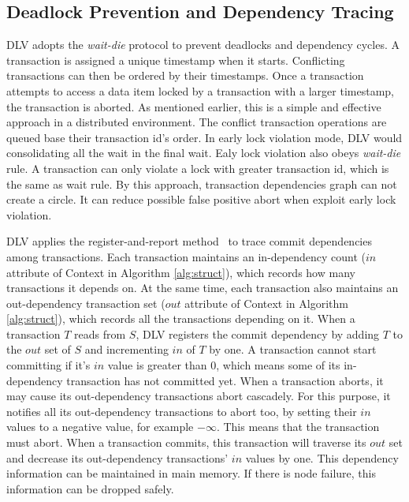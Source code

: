 \documentclass[conference]{IEEEtran}
\begin{document}
\subsection {Deadlock Prevention and Dependency Tracing}

DLV adopts the \emph{wait-die} protocol to prevent deadlocks and dependency cycles.
A transaction is assigned a unique timestamp when it starts.
Conflicting transactions can then be ordered by their timestamps.
Once a transaction attempts to access a data item locked by a transaction with a larger timestamp, the transaction is aborted.
As mentioned earlier, this is a simple and effective approach in a distributed environment.
The conflict transaction operations are queued base their transaction id's order.
In early lock violation mode, 
DLV would consolidating all the wait in the final wait.
Ealy lock violation also obeys \emph{wait-die} rule.
A transaction can only violate a lock with greater transaction id,
which is the same as wait rule.
By this approach, transaction dependencies graph can not create a circle.
It can reduce possible false positive abort when exploit early lock violation.

DLV applies the register-and-report method~\cite{HeckatonMVCC:journals/pvldb/LarsonBDFPZ11} to trace commit dependencies among transactions.
Each transaction maintains an in-dependency count (${in}$ attribute of Context in Algorithm \ref{alg:struct}), which records how many transactions it depends on.
At the same time, each transaction also maintains an out-dependency transaction set (${out}$ attribute of Context in Algorithm \ref{alg:struct}), which records all the transactions depending on it.
When a transaction ${T}$ reads from ${S}$,
DLV registers the commit dependency by adding ${T}$ to the ${out}$ set of ${S}$ and incrementing ${in}$ of ${T}$ by one.
A transaction cannot start committing if it's ${in}$ value is greater than 0, which means some of its in-dependency transaction has not committed yet.
When a transaction aborts, it may cause its out-dependency transactions abort cascadely. 
For this purpose, it notifies all its out-dependency transactions to abort too, by setting their ${in}$ values to a negative value, for example ${-\infty}$.
This means that the transaction must abort.
When a transaction commits, this transaction will traverse its ${out}$ set and decrease its out-dependency transactions' ${in}$ values by one.
This dependency information can be maintained in main memory.
If there is node failure, this information can be dropped safely. 
\end{document}
